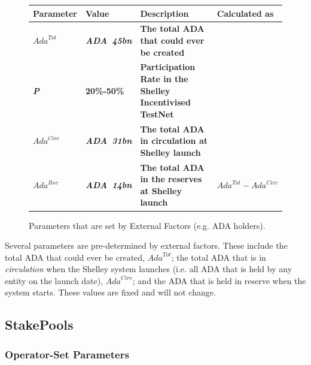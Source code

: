 \documentclass[11pt,a4paper,dvipsnames,twosided,final]{article}
\newcommand{\ada}{ADA{}}
\newcommand{\ADA}[1]{\textbf{\emph{\ada~{#1}}}}
\begin{document}
\begin{figure}[h!]
\begin{center}
\begin{tabular}{||l|l|p{6cm}|l||}
  \hline \hline
\textbf{Parameter} & \textbf{Value} & \textbf{Description} & \textbf{Calculated as} \\\hline
\textbf{\color{blue} $\textit{Ada}^{Tot}$ } & \textbf{\color{blue}  \ADA{45bn} } & \textbf{\color{blue}  The total \ada{} that could ever be created } & \textbf{\color{blue}  } \\\hline
\textbf{\color{blue} \emph{P} } & \textbf{\color{blue}  20\%-50\% } & \textbf{\color{blue}  Participation Rate in the Shelley Incentivised TestNet } & \textbf{\color{blue}  } \\\hline
\textbf{\color{blue} $\textit{Ada}^{\textit{Circ}}$ } & \textbf{\color{blue}  \ADA{31bn} } & \textbf{\color{blue}  The total \ada{} in circulation at Shelley launch } & \textbf{\color{blue}  } \\\hline
\textbf{\color{blue} $\textit{Ada}^{\textit{Rsv}}$ } & \textbf{\color{blue}  \ADA{14bn} } & \textbf{\color{blue}  The total \ada{} in the reserves at Shelley launch } & \textbf{\color{blue}  $\textit{Ada}^{Tot} - \textit{Ada}^{\textit{Circ}}$ } \\\hline
\hline
\end{tabular}
\end{center}
\caption{Parameters that are set by External Factors (e.g. \ada{} holders).}
\end{figure}

\noindent
Several parameters are pre-determined by external factors. These include the
total \ada{} that could ever be created, $\textit{Ada}^{Tot}$;
the total \ada{} that is in \emph{circulation} when the Shelley system launches
(i.e. all \ada{} that is held by any entity on the launch date), $\textit{Ada}^{\textit{Circ}}$;
and the \ada{} that is held in reserve when the system starts.
These values are fixed and will not change.

\subsection{StakePools}

\subsubsection*{Operator-Set Parameters}
\end{document}
